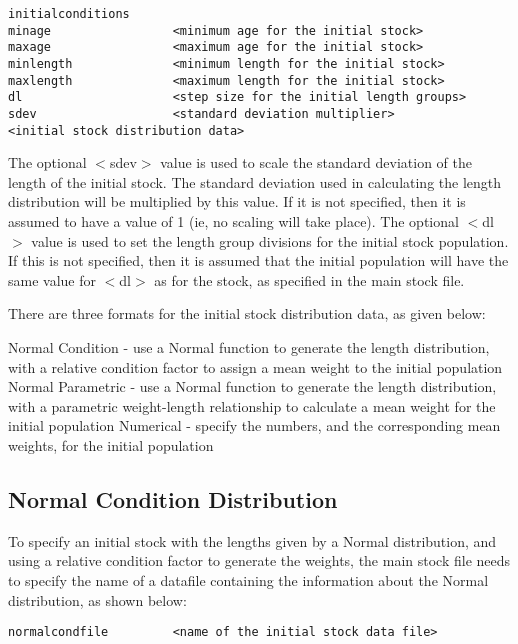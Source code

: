 \documentclass[10pt,twoside]{book}
\begin{document}
{\small\begin{verbatim}
initialconditions
minage                 <minimum age for the initial stock>
maxage                 <maximum age for the initial stock>
minlength              <minimum length for the initial stock>
maxlength              <maximum length for the initial stock>
dl                     <step size for the initial length groups>
sdev                   <standard deviation multiplier>
<initial stock distribution data>
\end{verbatim}}

The optional $<$sdev$>$ value is used to scale the standard deviation of the length of the initial stock.  The standard deviation used in calculating the length distribution will be multiplied by this value.  If it is not specified, then it is assumed to have a value of 1 (ie, no scaling will take place).  The optional $<$dl$>$ value is used to set the length group divisions for the initial stock population.  If this is not specified, then it is assumed that the initial population will have the same value for $<$dl$>$ as for the stock, as specified in the main stock file.

\bigskip
There are three formats for the initial stock distribution data, as given below:

\bigskip
Normal Condition - use a Normal function to generate the length distribution, with a relative condition factor to assign a mean weight to the initial population\newline
Normal Parametric - use a Normal function to generate the length distribution, with a parametric weight-length relationship to calculate a mean weight for the initial population\newline
Numerical - specify the numbers, and the corresponding mean weights, for the initial population

\subsection{Normal Condition Distribution}
To specify an initial stock with the lengths given by a Normal distribution, and using a relative condition factor to generate the weights, the main stock file needs to specify the name of a datafile containing the information about the Normal distribution, as shown below:

{\small\begin{verbatim}
normalcondfile         <name of the initial stock data file>
\end{verbatim}}
\end{document}
